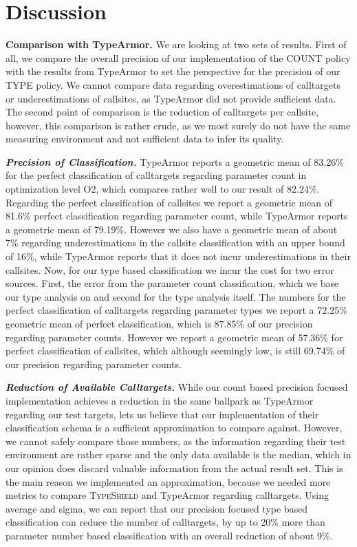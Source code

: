 \section{Discussion}
\label{chapter:Discussion}

\textbf{Comparison with TypeArmor.}
\label{section:comptype}
We are looking at two sets of results. First of all, we compare the overall precision of our implementation
of the COUNT policy with the results from TypeArmor to set the perspective for the precision of our TYPE 
policy. We cannot compare data regarding overestimations of calltargets or underestimations of callsites, 
as TypeArmor did not provide sufficient data. The second point of comparison is the reduction of calltargets
per callsite, however, this comparison is rather crude, as we most surely do not have the same measuring
environment and not sufficient data to infer its quality.

\textbf{\textit{Precision of Classification.}}
TypeArmor reports a geometric mean of 83.26\% for the perfect classification of calltargets regarding 
parameter count in optimization level O2, which compares rather well to our result of 82.24\%. Regarding
the perfect classification of callsites we report a geometric mean of 81.6\% perfect classification 
regarding parameter count, while TypeArmor reports a geometric mean of 79.19\%. However we also have
a geometric mean of about 7\% regarding underestimations in the callsite classification with an upper
bound of 16\%, while TypeArmor reports that it does not incur underestimations in their callsites.
Now, for our type based classification we incur the cost for two error sources. First, the error from
the parameter count classification, which we base our type analysis on and second for the type analysis
itself. The numbers for the perfect classification of calltargets regarding parameter types we report a
72.25\% geometric mean of perfect classification, which is 87.85\% of our precision regarding parameter
counts. However we report a geometric mean of 57.36\%
for perfect classification of callsites, which although seemingly low, is still 69.74\% of our precision
regarding parameter counts.

\textbf{\textit{Reduction of Available Calltargets.}}
While our count based precision focused implementation achieves a reduction in the same ballpark as
TypeArmor regarding our test targets, lets us believe that our implementation of their classification
schema is a sufficient approximation to compare against. However, we cannot safely compare those numbers,
as the information regarding their test environment are rather sparse and the only data available is the
median, which in our opinion does discard valuable information from the actual result set. This is the
main reason we implemented an approximation, because we needed more metrics to compare \textsc{TypeShield}
and TypeArmor regarding calltargets. Using average and sigma, we can report that our precision focused
type based classification can reduce the number of calltargets, by up to 20\% more than parameter number
based classification with an overall reduction of about 9\%.


